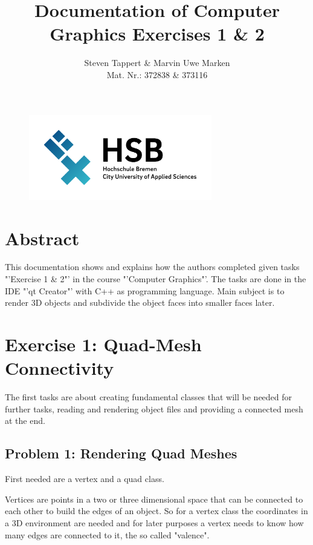 \documentclass[11.5pt,oneside,a4paper]{scrartcl}
\title{Documentation of Computer Graphics Exercises 1 \& 2}
\author{Steven Tappert \& Marvin Uwe Marken\\\small{Mat. Nr.: 372838 \& 373116}}
\date{}
\newcounter{ct}
\begin{document}
\clearpage
{\let\newpage\relax\maketitle}
\thispagestyle{empty}
\vspace{20pt}

\begin{figure}
	\centering
	\includegraphics[width=8cm]{hsb.png} \\
	
\end{figure}

\newpage
\tableofcontents
\newpage

\section{Abstract}
This documentation shows and explains how the authors completed given tasks "'Exercise 1 \& 2"' in the course "'Computer Graphics"'. The tasks are done in the IDE "'qt Creator"' with C++ as programming language. Main subject is to render 3D objects and subdivide the object faces into smaller faces later.

\section{Exercise 1: Quad-Mesh Connectivity}

The first tasks are about creating fundamental classes that will be needed for further tasks, reading and rendering object files and providing a connected mesh at the end.


\subsection{Problem 1: Rendering Quad Meshes}

First needed are a vertex and a quad class.

Vertices are points in a two or three dimensional space that can be connected to each other to build the edges of an object. So for a vertex class the coordinates in a 3D environment are needed and for later purposes a vertex needs to know how many edges are connected to it, the so called "valence".
\end{document}
